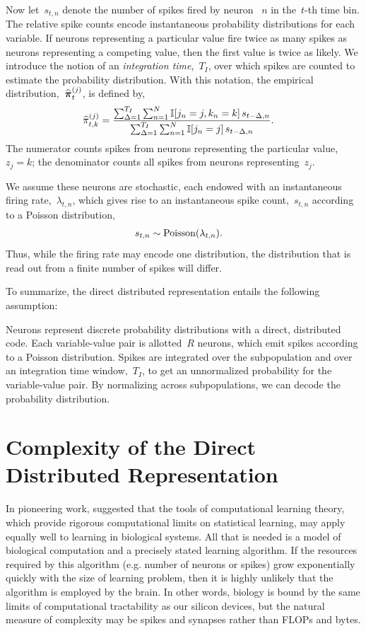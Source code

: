 Now let~$s_{t,n}$ denote the number of spikes fired by neuron ~$n$ in
the~$t$-th time bin. The relative spike counts encode instantaneous
probability distributions for each variable.  If neurons representing
a particular value fire twice as many spikes as neurons representing a
competing value, then the first value is twice as likely. We introduce
the notion of an \emph{integration time},~$T_I$, over which spikes are
counted to estimate the probability distribution. With this notation,
the empirical distribution,~$\widehat{\boldsymbol{\pi}}_t^{(j)}$, is defined by,
\begin{align*}
  \widehat{\pi}_{t,k}^{(j)} &=
  \frac{\sum_{\Delta = 1}^{T_I} \sum_{n=1}^N \mathbb{I}[j_n=j, k_n=k] \, s_{t-\Delta,n}}
       {\sum_{\Delta = 1}^{T_I} \sum_{n=1}^N \mathbb{I}[j_n=j] \, s_{t-\Delta,n}}.
\end{align*}
The numerator counts spikes from neurons representing the particular value,~$z_j=k$;
the denominator counts all spikes from neurons representing~$z_j$.


We assume these neurons are stochastic, each endowed
with an instantaneous firing rate,~$\lambda_{t,n}$, which gives rise to an
instantaneous spike count,~$s_{t,n}$ according to a Poisson distribution,
\begin{align*}
s_{t,n} &\sim \mathrm{Poisson}(\lambda_{t,n}).
\end{align*}
Thus, while the firing rate may encode one distribution, the distribution
that is read out from a finite number of spikes will differ. 

To summarize, the direct distributed representation entails the following
assumption:

\begin{assumption}
  Neurons represent discrete probability distributions with a direct,
  distributed code. Each variable-value pair is allotted~$R$ neurons,
  which emit spikes according to a Poisson distribution.
  Spikes are integrated over the subpopulation and over an integration
  time window,~$T_I$, to get an unnormalized probability for the
  variable-value pair. By normalizing across subpopulations, we can decode
  the probability distribution. 
\end{assumption}

\section{Complexity of the Direct Distributed Representation}
\label{sec:complexity}

In pioneering work, \citet{valiant1994circuits} suggested that
the tools of computational learning theory, which provide
rigorous computational limits on statistical learning, may
apply equally well to learning in biological systems. All
that is needed is a model of biological computation and a
precisely stated learning algorithm. If the resources
required by this algorithm (e.g. number of neurons or spikes)
grow exponentially quickly with the size of learning problem,
then it is highly unlikely that the algorithm is employed
by the brain. In other words, biology is bound by the same
limits of computational tractability as our silicon devices,
but the natural measure of complexity may be spikes and
synapses rather than FLOPs and bytes.


